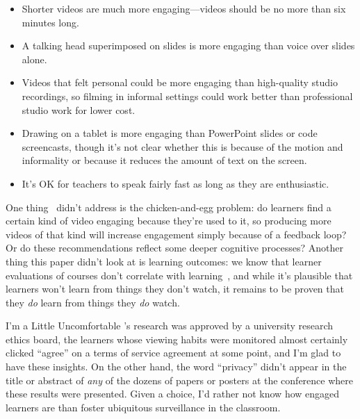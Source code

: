 \begin{itemize}

\item
  Shorter videos are much more engaging---videos should be no more than six minutes long.

\item
  A talking head superimposed on slides is more engaging than voice over slides alone.

\item
  Videos that felt personal could be more engaging than high-quality studio recordings,
  so filming in informal settings could work better than professional studio work for lower cost.

\item
  Drawing on a tablet is more engaging than PowerPoint slides or code screencasts,
  though it's not clear whether this is because of the motion and informality
  or because it reduces the amount of text on the screen.

\item
  It's OK for teachers to speak fairly fast as long as they are enthusiastic.

\end{itemize}

One thing~\cite{Guo2014} didn't address is the chicken-and-egg problem:
do learners find a certain kind of video engaging because they're used to it,
so producing more videos of that kind will increase engagement simply because of a feedback loop?
Or do these recommendations reflect some deeper cognitive processes?
Another thing this paper didn't look at is learning outcomes:
we know that learner evaluations of courses don't correlate with learning~\cite{Star2014,Uttl2017},
and while it's plausible that learners won't learn from things they don't watch,
it remains to be proven that they \emph{do} learn from things they \emph{do} watch.

\begin{aside}{I'm a Little Uncomfortable}
  \cite{Guo2014}'s research was approved by a university research ethics board,
  the learners whose viewing habits were monitored almost certainly clicked ``agree''
  on a terms of service agreement at some point,
  and I'm glad to have these insights.
  On the other hand,
  the word ``privacy'' didn't appear in the title or abstract
  of \emph{any} of the dozens of papers or posters at the conference where these results were presented.
  Given a choice,
  I'd rather not know how engaged learners are
  than foster ubiquitous surveillance in the classroom.
\end{aside}

